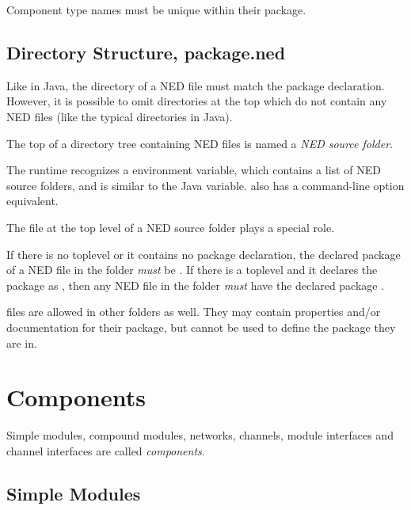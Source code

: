 Component type names must be unique within their package.


\subsection{Directory Structure, package.ned}
\label{sec:ned-ref:directory-structure}

Like in Java, the directory of a NED file must match the package
declaration. However, it is possible to omit directories at the top which do
not contain any NED files (like the typical 
directories in Java).

The top of a directory tree containing NED files is named a \textit{NED source
folder}.

\begin{note}
The {\opp} runtime recognizes a  environment variable, which
contains a list of NED source folders, and is similar to the Java 
variable.  also has a command-line option equivalent.
\end{note}

The  file at the top level of a NED source folder plays a
special role.

If there is no toplevel  or it contains no package declaration,
the declared package of a NED file in the folder 
\textit{must} be .
If there is a toplevel  and it declares the package as
, then any NED file in the folder 
\textit{must} have the declared package .

\begin{note}
     files are allowed in other folders as well.
    They may contain properties and/or documentation for their package,
    but cannot be used to define the package they are in.
\end{note}




\section{Components}
\label{sec:ned-ref:components}

Simple modules, compound modules, networks, channels, module interfaces
and channel interfaces are called \textit{components}.


\subsection{Simple Modules}
\label{sec:ned-ref:simple-modules}

